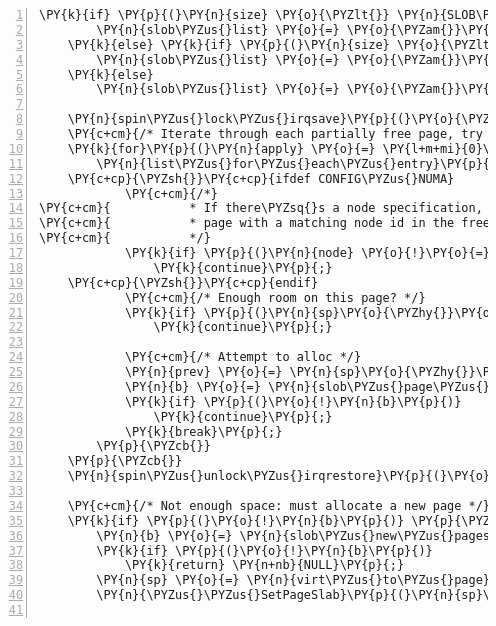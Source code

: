 \begin{Verbatim}[commandchars=\\\{\},numbers=left,firstnumber=1,stepnumber=1]
	\PY{k}{if} \PY{p}{(}\PY{n}{size} \PY{o}{\PYZlt{}} \PY{n}{SLOB\PYZus{}BREAK1}\PY{p}{)}
		\PY{n}{slob\PYZus{}list} \PY{o}{=} \PY{o}{\PYZam{}}\PY{n}{free\PYZus{}slob\PYZus{}small}\PY{p}{;}
	\PY{k}{else} \PY{k}{if} \PY{p}{(}\PY{n}{size} \PY{o}{\PYZlt{}} \PY{n}{SLOB\PYZus{}BREAK2}\PY{p}{)}
		\PY{n}{slob\PYZus{}list} \PY{o}{=} \PY{o}{\PYZam{}}\PY{n}{free\PYZus{}slob\PYZus{}medium}\PY{p}{;}
	\PY{k}{else}
		\PY{n}{slob\PYZus{}list} \PY{o}{=} \PY{o}{\PYZam{}}\PY{n}{free\PYZus{}slob\PYZus{}large}\PY{p}{;}

	\PY{n}{spin\PYZus{}lock\PYZus{}irqsave}\PY{p}{(}\PY{o}{\PYZam{}}\PY{n}{slob\PYZus{}lock}\PY{p}{,} \PY{n}{flags}\PY{p}{)}\PY{p}{;}
	\PY{c+cm}{/* Iterate through each partially free page, try to find room */}
	\PY{k}{for}\PY{p}{(}\PY{n}{apply} \PY{o}{=} \PY{l+m+mi}{0}\PY{p}{;} \PY{n}{apply} \PY{o}{\PYZlt{}}\PY{o}{=} \PY{l+m+mi}{1}\PY{p}{;} \PY{n}{apply}\PY{o}{+}\PY{o}{+}\PY{p}{)} \PY{p}{\PYZob{}}
		\PY{n}{list\PYZus{}for\PYZus{}each\PYZus{}entry}\PY{p}{(}\PY{n}{sp}\PY{p}{,} \PY{n}{slob\PYZus{}list}\PY{p}{,} \PY{n}{list}\PY{p}{)} \PY{p}{\PYZob{}}
	\PY{c+cp}{\PYZsh{}}\PY{c+cp}{ifdef CONFIG\PYZus{}NUMA}
			\PY{c+cm}{/*}
\PY{c+cm}{			 * If there\PYZsq{}s a node specification, search for a partial}
\PY{c+cm}{			 * page with a matching node id in the freelist.}
\PY{c+cm}{			 */}
			\PY{k}{if} \PY{p}{(}\PY{n}{node} \PY{o}{!}\PY{o}{=} \PY{n}{NUMA\PYZus{}NO\PYZus{}NODE} \PY{o}{\PYZam{}}\PY{o}{\PYZam{}} \PY{n}{page\PYZus{}to\PYZus{}nid}\PY{p}{(}\PY{n}{sp}\PY{p}{)} \PY{o}{!}\PY{o}{=} \PY{n}{node}\PY{p}{)}
				\PY{k}{continue}\PY{p}{;}
	\PY{c+cp}{\PYZsh{}}\PY{c+cp}{endif}
			\PY{c+cm}{/* Enough room on this page? */}
			\PY{k}{if} \PY{p}{(}\PY{n}{sp}\PY{o}{\PYZhy{}}\PY{o}{\PYZgt{}}\PY{n}{units} \PY{o}{\PYZlt{}} \PY{n}{SLOB\PYZus{}UNITS}\PY{p}{(}\PY{n}{size}\PY{p}{)}\PY{p}{)}
				\PY{k}{continue}\PY{p}{;}

			\PY{c+cm}{/* Attempt to alloc */}
			\PY{n}{prev} \PY{o}{=} \PY{n}{sp}\PY{o}{\PYZhy{}}\PY{o}{\PYZgt{}}\PY{n}{list}\PY{p}{.}\PY{n}{prev}\PY{p}{;}
			\PY{n}{b} \PY{o}{=} \PY{n}{slob\PYZus{}page\PYZus{}alloc}\PY{p}{(}\PY{n}{sp}\PY{p}{,} \PY{n}{size}\PY{p}{,} \PY{n}{align}\PY{p}{,} \PY{n}{apply}\PY{p}{,} \PY{o}{\PYZam{}}\PY{n}{best\PYZus{}fit}\PY{p}{)}\PY{p}{;}
			\PY{k}{if} \PY{p}{(}\PY{o}{!}\PY{n}{b}\PY{p}{)}
				\PY{k}{continue}\PY{p}{;}
			\PY{k}{break}\PY{p}{;}
		\PY{p}{\PYZcb{}}
	\PY{p}{\PYZcb{}}
	\PY{n}{spin\PYZus{}unlock\PYZus{}irqrestore}\PY{p}{(}\PY{o}{\PYZam{}}\PY{n}{slob\PYZus{}lock}\PY{p}{,} \PY{n}{flags}\PY{p}{)}\PY{p}{;}

	\PY{c+cm}{/* Not enough space: must allocate a new page */}
	\PY{k}{if} \PY{p}{(}\PY{o}{!}\PY{n}{b}\PY{p}{)} \PY{p}{\PYZob{}}
		\PY{n}{b} \PY{o}{=} \PY{n}{slob\PYZus{}new\PYZus{}pages}\PY{p}{(}\PY{n}{gfp} \PY{o}{\PYZam{}} \PY{o}{\PYZti{}}\PY{n}{\PYZus{}\PYZus{}GFP\PYZus{}ZERO}\PY{p}{,} \PY{l+m+mi}{0}\PY{p}{,} \PY{n}{node}\PY{p}{)}\PY{p}{;}
		\PY{k}{if} \PY{p}{(}\PY{o}{!}\PY{n}{b}\PY{p}{)}
			\PY{k}{return} \PY{n+nb}{NULL}\PY{p}{;}
		\PY{n}{sp} \PY{o}{=} \PY{n}{virt\PYZus{}to\PYZus{}page}\PY{p}{(}\PY{n}{b}\PY{p}{)}\PY{p}{;}
		\PY{n}{\PYZus{}\PYZus{}SetPageSlab}\PY{p}{(}\PY{n}{sp}\PY{p}{)}\PY{p}{;}


\end{Verbatim}
